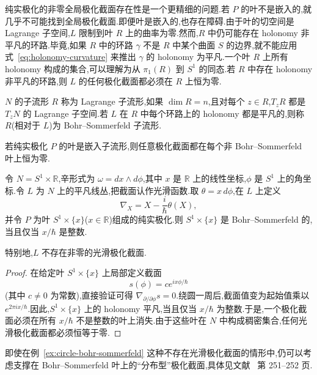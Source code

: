 纯实极化的非零全局极化截面存在性是一个更精细的问题.若 $P$ 的叶不是嵌入的,就几乎不可能找到全局极化截面.即便叶是嵌入的,也存在障碍.由于叶的切空间是 Lagrange 子空间,$L$ 限制到叶 $R$ 上的曲率为零.然而,$R$ 中仍可能存在 holonomy 非平凡的环路.毕竟,如果 $R$ 中的环路 $\gamma$ 不是 $R$ 中某个曲面 $S$ 的边界,就不能应用式~\eqref{eq:holonomy-curvature} 来推出 $\gamma$ 的 holonomy 为平凡.一个叶 $R$ 上所有 holonomy 构成的集合,可以理解为从 $\pi_1(R)$ 到 $S^1$ 的同态.若 $R$ 中存在 holonomy 非平凡的环路,则 $L$ 的任何极化截面都必须在 $R$ 上恒为零.

\begin{definition}
\label{def:bohr-sommerfeld}
$N$ 的子流形 $R$ 称为 Lagrange 子流形,如果 $\dim R=n$,且对每个 $z\in R$,$T_zR$ 都是 $T_zN$ 的 Lagrange 子空间.若 $L$ 在 $R$ 中每个环路上的 holonomy 都是平凡的,则称 $R$(相对于 $L$)为 Bohr--Sommerfeld 子流形.
\end{definition}

\begin{conclusion}[实极化截面的叶上消失]
\label{con:real-polarized-vanishing}
若纯实极化 $P$ 的叶是嵌入子流形,则任意极化截面都在每个非 Bohr--Sommerfeld 叶上恒为零.
\end{conclusion}

\begin{example}
\label{ex:circle-bohr-sommerfeld}
令 $N=S^1\times\mathbb R$,辛形式为 $\omega=dx\wedge d\phi$,其中 $x$ 是 $\mathbb R$ 上的线性坐标,$\phi$ 是 $S^1$ 上的角坐标.令 $L$ 为 $N$ 上的平凡线丛,把截面认作光滑函数.取 $\theta=x\,d\phi$,在 $L$ 上定义
\[
 \nabla_X=X-\frac{i}{\hbar}\theta(X),
\]
并令 $P$ 为叶 $S^1\times\{x\}$($x\in\mathbb R$)组成的纯实极化.则 $S^1\times\{x\}$ 是 Bohr--Sommerfeld 的,当且仅当 $x/\hbar$ 是整数.
\end{example}

特别地,$L$ 不存在非零的光滑极化截面.

\begin{proof}
在给定叶 $S^1\times\{x\}$ 上局部定义截面
\[
 s(\phi)=ce^{ix\phi/\hbar}
\]
(其中 $c\ne0$ 为常数),直接验证可得 $\nabla_{\partial/\partial\phi}s=0$.绕圆一周后,截面值变为起始值乘以 $e^{2\pi ix/\hbar}$.因此,$S^1\times\{x\}$ 上的 holonomy 平凡,当且仅当 $x/\hbar$ 为整数.于是,一个极化截面必须在所有 $x/\hbar$ 不是整数的叶上消失.由于这些叶在 $N$ 中构成稠密集合,任何光滑极化截面都必须恒等于零.
\end{proof}

即使在例~\ref{ex:circle-bohr-sommerfeld} 这种不存在光滑极化截面的情形中,仍可以考虑支撑在 Bohr--Sommerfeld 叶上的“分布型”极化截面,具体见文献~\cite{Woodhouse1992} 第 251--252 页.

